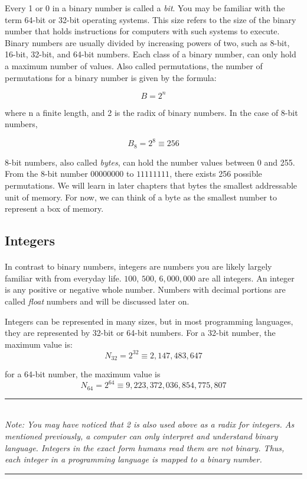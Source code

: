 \par Every 1 or 0 in a binary number is called a \textit{bit}. You may be familiar with the term 64-bit or 32-bit operating systems. This size refers to the size of the binary number that holds instructions for computers with such systems to execute. Binary numbers are usually divided by increasing powers of two, such as 8-bit, 16-bit, 32-bit, and 64-bit numbers. Each class of a binary number, can only hold a maximum number of values. Also called permutations, the number of permutations for a binary number is given by the formula:

$$
B = 2^n
$$

where n a finite length, and 2 is the radix of binary numbers. In the case of 8-bit numbers, 

$$
B_8 = 2^8 \equiv 256
$$

8-bit numbers, also called \textit{bytes}, can hold the number values between 0 and 255. From the 8-bit number $00000000$ to $11111111$, there exists 256 possible permutations. We will learn in later chapters that bytes the smallest addressable unit of memory. For now, we can think of a byte as the smallest number to represent a box of memory.

\subsection{Integers}

\paragraph{   }In contrast to binary numbers, integers are numbers you are likely largely familiar with from everyday life. $100$, $500$, $6,000,000$ are all integers. An integer is any positive or negative whole number. Numbers with decimal portions are called \textit{float} numbers and will be discussed later on.

\par Integers can be represented in many sizes, but in most programming languages, they are represented by 32-bit or 64-bit numbers. For a 32-bit number, the maximum value is:
$$
N_{32} = 2^{32} \equiv 2,147,483,647
$$

for a 64-bit number, the maximum value is
$$
N_{64} = 2^{64} \equiv 9,223,372,036,854,775,807
$$

\noindent\rule{4cm}{0.4pt} \\
\emph{Note: You may have noticed that 2 is also used above as a radix for integers. As mentioned previously, a computer can only interpret and understand binary language. Integers in the exact form humans read them are not binary. Thus, each integer in a programming language is mapped to a binary number. } \\
\noindent\rule{4cm}{0.4pt}

